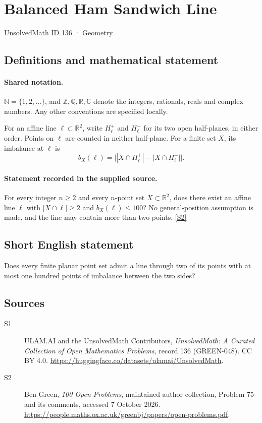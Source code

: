 \documentclass[11pt]{article}
\newcommand{\sref}[2]{\hyperlink{source:#1:#2}{[S#2]}}
\begin{document}
\setcounter{section}{135}
\section{Balanced Ham Sandwich Line}\label{136}
{\small\sffamily UnsolvedMath ID 136 · Geometry}
\subsection{Definitions and mathematical statement}

\paragraph{Shared notation.}$\mathbb N=\{1,2,\ldots\}$, and $\mathbb Z,\mathbb Q,\mathbb R,\mathbb C$ denote the integers, rationals, reals and complex numbers. Any other conventions are specified locally.


For an affine line $\ell\subset\mathbb R^2$, write $H_\ell^+$ and $H_\ell^-$ for its two open half-planes, in either order. Points on $\ell$ are counted in neither half-plane. For a finite set $X$, its imbalance at $\ell$ is
\[
 b_X(\ell)=\bigl||X\cap H_\ell^+|-|X\cap H_\ell^-|\bigr|.
\]
\paragraph{Statement recorded in the supplied source.}
For every integer $n\geq2$ and every $n$-point set $X\subset\mathbb R^2$, does there exist an affine line $\ell$ with $|X\cap\ell|\geq2$ and $b_X(\ell)\leq100$? No general-position assumption is made, and the line may contain more than two points. \sref{136}{2}
\subsection{Short English statement}
Does every finite planar point set admit a line through two of its points with at most one hundred points of imbalance between the two sides?
\subsection{Sources}
\begin{description}
\item[\hypertarget{source:136:1}{S1}] ULAM.AI and the UnsolvedMath Contributors, \emph{UnsolvedMath: A Curated Collection of Open Mathematics Problems}, record 136 (GREEN-048). CC BY 4.0. \url{https://huggingface.co/datasets/ulamai/UnsolvedMath}.
\item[\hypertarget{source:136:2}{S2}] Ben Green, \emph{100 Open Problems}, maintained author collection, Problem 75 and its comments, accessed 7 October 2026. \url{https://people.maths.ox.ac.uk/greenbj/papers/open-problems.pdf}.
\end{description}
\label{end:136}
\end{document}
